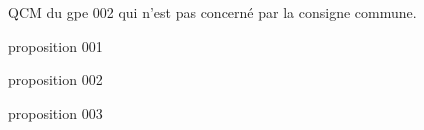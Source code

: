 \begin{exercice*}
    QCM du gpe 002 qui n'est pas concerné par la consigne commune.
    \begin{ChoixQCM}{3}
    \item proposition 001
    \item proposition 002
    \item proposition 003
    \end{ChoixQCM}
\end{exercice*}
\begin{corrige}
\end{corrige}